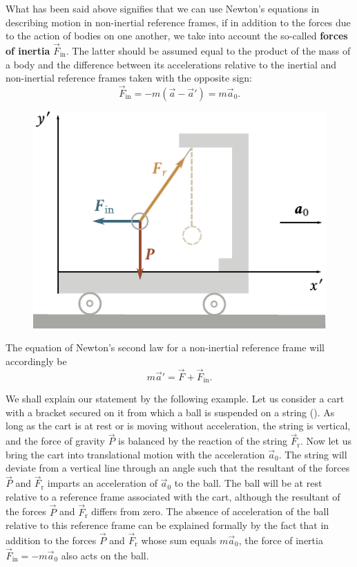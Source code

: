 What has been said above signifies that we can use Newton's equations in describing motion in non-inertial reference frames, if in addition to the forces due to the action of bodies on one another, we take into account the so-called \textbf{forces of inertia} $\vec{F}_{\text{in}}$. The latter should be assumed equal to the product of the mass of a body and the difference between its accelerations relative to the inertial and non-inertial reference frames taken with the opposite sign:
\begin{equation}\label{eq:4_2}
\vec{F}_{\text{in}} = -m(\vec{a} - \vec{a}') = m\vec{a}_0.
\end{equation}

\begin{figure}[t]
	\begin{center}
		\includegraphics[scale=0.95]{figures/ch_04/fig_4_1.pdf}
		\caption[]{}
		\label{fig:4_1}
	\end{center}
\end{figure}

\noindent
The equation of Newton's second law for a non-inertial reference frame will accordingly be
\begin{equation}\label{eq:4_3}
m\vec{a}' = \vec{F} + \vec{F}_{\text{in}}.
\end{equation}

We shall explain our statement by the following example. Let us consider a cart with a bracket secured on it from which a ball is suspended on a string (). As long as the cart is at rest or is moving without acceleration, the string is vertical, and the force of gravity $\vec{P}$ is balanced by the reaction of the string $\vec{F}_{\text{r}}$. Now let us bring the cart into translational motion with the acceleration $\vec{a}_0$. The string will deviate from a vertical line through an angle such that the resultant of the forces $\vec{P}$ and $\vec{F}_{\text{r}}$ imparts an acceleration of $\vec{a}_0$ to the ball. The ball will be at rest relative to a reference frame associated with the cart, although the resultant of the forces $\vec{P}$ and $\vec{F}_{\text{r}}$ differs from zero. The absence of acceleration of the ball relative to this reference frame can be explained formally by the fact that in addition to the forces $\vec{P}$ and $\vec{F}_{\text{r}}$ whose sum equals $m\vec{a}_0$, the force of inertia $\vec{F}_{\text{in}}=-m\vec{a}_0$ also acts on the ball.


